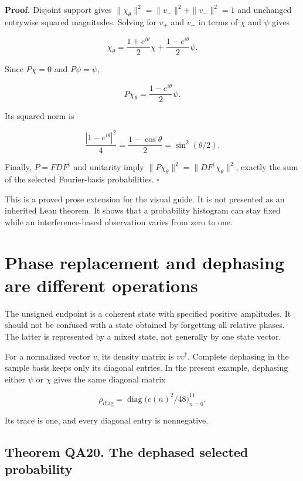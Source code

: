 \textbf{Proof.} Disjoint support gives
\(\|\chi_\theta\|^2=\|v_+\|^2+\|v_-\|^2=1\) and unchanged entrywise
squared magnitudes. Solving for \(v_+\) and \(v_-\) in terms of \(\chi\)
and \(\psi\) gives

\[
\chi_\theta
=\frac{1+e^{i\theta}}2\chi
+\frac{1-e^{i\theta}}2\psi.
\]

Since \(P\chi=0\) and \(P\psi=\psi\),

\[
P\chi_\theta=\frac{1-e^{i\theta}}2\psi.
\]

Its squared norm is

\[
\frac{|1-e^{i\theta}|^2}{4}
=\frac{1-\cos\theta}{2}
=\sin^2(\theta/2).
\]

Finally, \(P=FDF^\dagger\) and unitarity imply
\(\|P\chi_\theta\|^2=\|DF^\dagger\chi_\theta\|^2\), exactly the sum of
the selected Fourier-basis probabilities. \(\square\)

This is a proved prose extension for the visual guide. It is not
presented as an inherited Lean theorem. It shows that a probability
histogram can stay fixed while an interference-based observation varies
from zero to one.

\hypertarget{phase-replacement-and-dephasing-are-different-operations}{%
\section{Phase replacement and dephasing are different
operations}\label{phase-replacement-and-dephasing-are-different-operations}}

The unsigned endpoint is a coherent state with specified positive
amplitudes. It should not be confused with a state obtained by
forgetting all relative phases. The latter is represented by a mixed
state, not generally by one state vector.

For a normalized vector \(v\), its density matrix is \(vv^\dagger\).
Complete dephasing in the sample basis keeps only its diagonal entries.
In the present example, dephasing either \(\psi\) or \(\chi\) gives the
same diagonal matrix

\[
\rho_{\mathrm{diag}}=\operatorname{diag}\big(c(n)^2/48\big)_{n=0}^{11}.
\]

Its trace is one, and every diagonal entry is nonnegative.

\hypertarget{theorem-qa20.-the-dephased-selected-probability}{%
\subsection*{Theorem QA20. The dephased selected
probability}\label{theorem-qa20.-the-dephased-selected-probability}}

